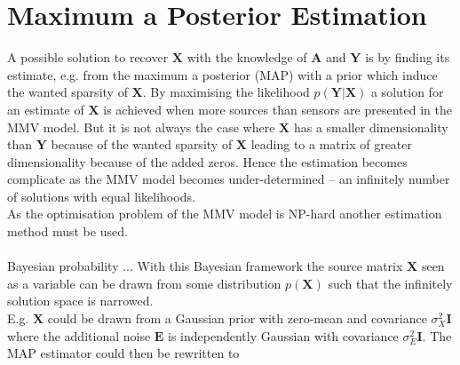 \section{Maximum a Posterior Estimation}
A possible solution to recover $\mathbf{X}$ with the knowledge of $\mathbf{A}$ and $\mathbf{Y}$ is by finding its estimate, e.g. from the maximum a posterior (MAP) with a prior which induce the wanted sparsity of $\mathbf{X}$. By maximising the likelihood $p(\mathbf{Y} \vert \mathbf{X})$ a solution for an estimate of $\mathbf{X}$ is achieved when more sources than sensors are presented in the MMV model. But it  is not always the case where $\mathbf{X}$ has a smaller dimensionality than $\mathbf{Y}$ because of the wanted sparsity of $\mathbf{X}$ leading to a matrix of greater dimensionality because of the added zeros. Hence the estimation becomes complicate as the MMV model becomes under-determined -- an infinitely number of solutions with equal likelihoods.
\\
As the optimisation problem of the MMV model is NP-hard another estimation method must be used.
\\ \\
Bayesian probability  ... With this Bayesian framework the source matrix $\mathbf{X}$ seen as a variable can be drawn from some distribution $p(\mathbf{X})$ such that the infinitely solution space is narrowed. 
\\
E.g. $\mathbf{X}$ could be drawn from a Gaussian prior with zero-mean and covariance $\sigma_X^2 \mathbf{I}$ where the additional noise $\mathbf{E}$ is independently Gaussian with covariance $\sigma_E^2 \mathbf{I}$. The MAP estimator could then be rewritten to
